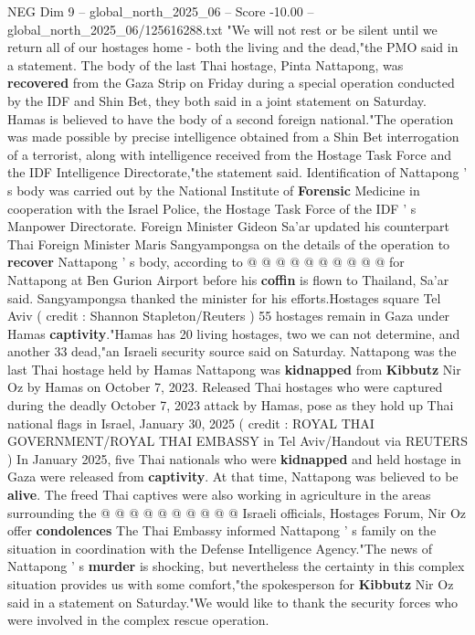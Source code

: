 \begin{textsample}{NEG Dim 9 – global\_north\_2025\_06 – Score -10.00 – global\_north\_2025\_06/125616288.txt}  \label{ex:f9_neg_092}
"We will not rest or be silent until we return all of our hostages home - both the living and the dead,"the PMO said in a statement.
The body of the last Thai hostage, Pinta Nattapong, was \textbf{recovered} from the Gaza Strip on Friday during a special operation conducted by the IDF and Shin Bet, they both said in a joint statement on Saturday.
Hamas is believed to have the body of a second foreign national."The operation was made possible by precise intelligence obtained from a Shin Bet interrogation of a terrorist, along with intelligence received from the Hostage Task Force and the IDF Intelligence Directorate,"the statement said.
Identification of Nattapong ' s body was carried out by the National Institute of \textbf{Forensic} Medicine in cooperation with the Israel Police, the Hostage Task Force of the IDF ' s Manpower Directorate.
Foreign Minister Gideon Sa'ar updated his counterpart Thai Foreign Minister Maris Sangyampongsa on the details of the operation to \textbf{recover} Nattapong ' s body, according to @ @ @ @ @ @ @ @ @ @ for Nattapong at Ben Gurion Airport before his \textbf{coffin} is flown to Thailand, Sa'ar said.
Sangyampongsa thanked the minister for his efforts.Hostages square Tel Aviv ( credit : Shannon Stapleton/Reuters ) 55 hostages remain in Gaza under Hamas \textbf{captivity}."Hamas has 20 living hostages, two we can not determine, and another 33 dead,"an Israeli security source said on Saturday.
Nattapong was the last Thai hostage held by Hamas Nattapong was \textbf{kidnapped} from \textbf{Kibbutz} Nir Oz by Hamas on October 7, 2023.
Released Thai hostages who were captured during the deadly October 7, 2023 attack by Hamas, pose as they hold up Thai national flags in Israel, January 30, 2025 ( credit : ROYAL THAI GOVERNMENT/ROYAL THAI EMBASSY in Tel Aviv/Handout via REUTERS ) In January 2025, five Thai nationals who were \textbf{kidnapped} and held hostage in Gaza were released from \textbf{captivity}.
At that time, Nattapong was believed to be \textbf{alive}.
The freed Thai captives were also working in agriculture in the areas surrounding the @ @ @ @ @ @ @ @ @ @ Israeli officials, Hostages Forum, Nir Oz offer \textbf{condolences} The Thai Embassy informed Nattapong ' s family on the situation in coordination with the Defense Intelligence Agency."The news of Nattapong ' s \textbf{murder} is shocking, but nevertheless the certainty in this complex situation provides us with some comfort,"the spokesperson for \textbf{Kibbutz} Nir Oz said in a statement on Saturday."We would like to thank the security forces who were involved in the complex rescue operation.

\end{textsample}
